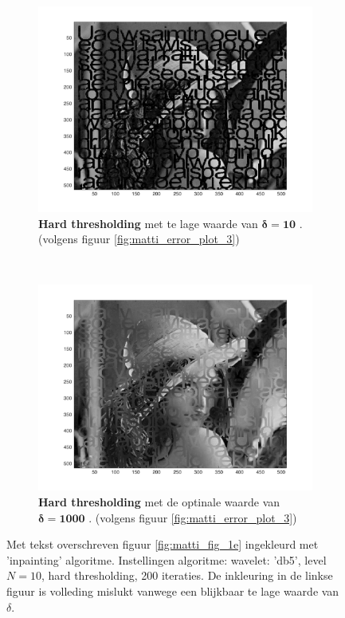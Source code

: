 \begin{figure}
    \centering
    \begin{subfigure}[b]{0.45\textwidth}
        \includegraphics[width=\textwidth]{../src/inpainting/lena_failed_4}
        \caption{ \textbf{Hard thresholding} met te lage waarde van $\mathbf{\delta = 10 }$ . (volgens figuur \ref{fig:matti_error_plot_3})}
        \label{fig:matti_failed_4}
    \end{subfigure}
    ~ %
    \begin{subfigure}[b]{0.45\textwidth}
        \includegraphics[width=\textwidth]{../src/inpainting/lena_optimal_4}
        \caption{\textbf{Hard thresholding} met de optinale waarde van $\mathbf{\delta = 1000 }$ . (volgens figuur \ref{fig:matti_error_plot_3})}
        \label{fig:matti_optimal_4}
    \end{subfigure}
    \caption{Met tekst overschreven figuur \ref{fig:matti_fig_1e} ingekleurd met 'inpainting' algoritme. Instellingen algoritme: wavelet: 'db5', level $N = 10$, hard thresholding, 200 iteraties. De inkleuring in de linkse figuur is volleding mislukt vanwege een blijkbaar te lage waarde van $\delta$.} \label{fig:matti_hard_4}
\end{figure}

